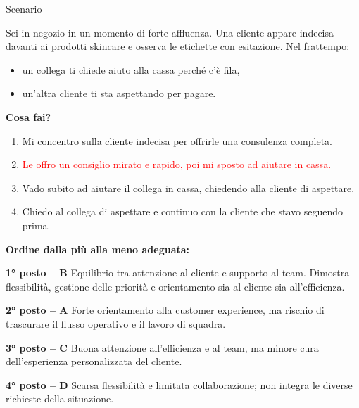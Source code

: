 \documentclass[compress]{beamer}
\begin{document}
\begin{frame}
	\begin{block}{Scenario}
		
		Sei in negozio in un momento di forte affluenza.  
		Una cliente appare indecisa davanti ai prodotti skincare e osserva le etichette con esitazione.  
		Nel frattempo:
		\begin{itemize}
			\item un collega ti chiede aiuto alla cassa perché c’è fila,
			\item un’altra cliente ti sta aspettando per pagare.
		\end{itemize}
		
		\textbf{Cosa fai?}
		
		\begin{enumerate}
			\item[A.] Mi concentro sulla cliente indecisa per offrirle una consulenza completa.
			
			\item[B.] \textcolor<2->{red}{Le offro un consiglio mirato e rapido, poi mi sposto ad aiutare in cassa.}
			\item[C.] Vado subito ad aiutare il collega in cassa, chiedendo alla cliente di aspettare.
			\item[D.] Chiedo al collega di aspettare e continuo con la cliente che stavo seguendo prima.
		\end{enumerate}
	\end{block}	
\end{frame}

\begin{frame}
	
	\textbf{Ordine dalla più alla meno adeguata:}
	
	\vspace{0.3cm}
	
	\textbf{1° posto – B}  
	Equilibrio tra attenzione al cliente e supporto al team.  
	Dimostra flessibilità, gestione delle priorità e orientamento sia al cliente sia all’efficienza.
	
	\vspace{0.3cm}
	
	\textbf{2° posto – A}  
	Forte orientamento alla customer experience, ma rischio di trascurare il flusso operativo e il lavoro di squadra.
	
	\vspace{0.3cm}
	
	\textbf{3° posto – C}  
	Buona attenzione all’efficienza e al team, ma minore cura dell’esperienza personalizzata del cliente.
	
	\vspace{0.3cm}
	
	\textbf{4° posto – D}  
	Scarsa flessibilità e limitata collaborazione; non integra le diverse richieste della situazione.
	
\end{frame}
\end{document}
